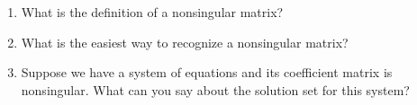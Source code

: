 \begin{enumerate}
%
\item What is the definition of a nonsingular matrix?
%
\item What is the easiest way to recognize a nonsingular matrix?
%
\item Suppose we have a system of equations and its coefficient matrix is nonsingular.  What can you say about the solution set for this system?
%
\end{enumerate}

